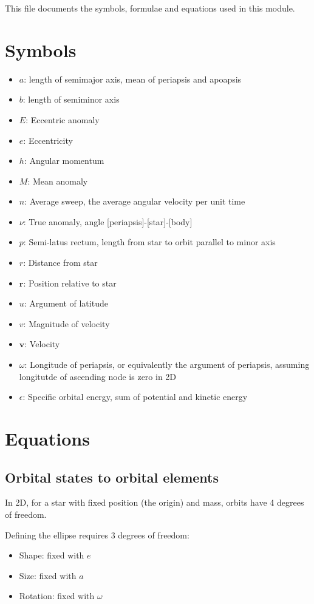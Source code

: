 \documentclass{article}
\begin{document}
This file documents the symbols, formulae and equations used in this module.

\section{Symbols}

\begin{itemize}
	\item $a$: length of semimajor axis, mean of periapsis and apoapsis
	\item $b$: length of semiminor axis
	\item $E$: Eccentric anomaly
	\item $e$: Eccentricity
	\item $h$: Angular momentum
	\item $M$: Mean anomaly
	\item $n$: Average sweep, the average angular velocity per unit time
	\item $\nu$: True anomaly, angle [periapsis]-[star]-[body]
	\item $p$: Semi-latus rectum, length from star to orbit parallel to minor axis
	\item $r$: Distance from star
	\item $\mathbf r$: Position relative to star
	\item $u$: Argument of latitude
	\item $v$: Magnitude of velocity
	\item $\mathbf v$: Velocity
	\item $\omega$: Longitude of periapsis, or equivalently the argument of periapsis, assuming longitutde of ascending node is zero in 2D
	\item $\epsilon$: Specific orbital energy, sum of potential and kinetic energy
\end{itemize}

\section{Equations}
\subsection{Orbital states to orbital elements}
In 2D, for a star with fixed position (the origin) and mass, orbits have 4 degrees of freedom.

Defining the ellipse requires 3 degrees of freedom:

\begin{itemize}
	\item Shape: fixed with $e$
	\item Size: fixed with $a$
	\item Rotation: fixed with $\omega$
\end{itemize}
\end{document}
